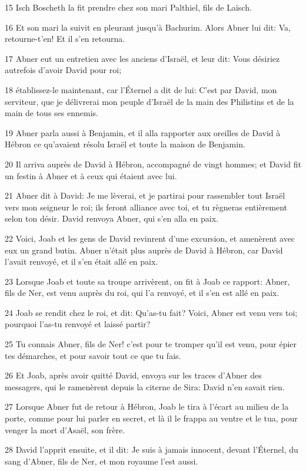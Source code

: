 \par 15 Isch Boscheth la fit prendre chez son mari Palthiel, fils de Laïsch.
\par 16 Et son mari la suivit en pleurant jusqu'à Bachurim. Alors Abner lui dit: Va, retourne-t'en! Et il s'en retourna.
\par 17 Abner eut un entretien avec les anciens d'Israël, et leur dit: Vous désiriez autrefois d'avoir David pour roi;
\par 18 établissez-le maintenant, car l'Éternel a dit de lui: C'est par David, mon serviteur, que je délivrerai mon peuple d'Israël de la main des Philistins et de la main de tous ses ennemis.
\par 19 Abner parla aussi à Benjamin, et il alla rapporter aux oreilles de David à Hébron ce qu'avaient résolu Israël et toute la maison de Benjamin.
\par 20 Il arriva auprès de David à Hébron, accompagné de vingt hommes; et David fit un festin à Abner et à ceux qui étaient avec lui.
\par 21 Abner dit à David: Je me lèverai, et je partirai pour rassembler tout Israël vers mon seigneur le roi; ils feront alliance avec toi, et tu règneras entièrement selon ton désir. David renvoya Abner, qui s'en alla en paix.
\par 22 Voici, Joab et les gens de David revinrent d'une excursion, et amenèrent avec eux un grand butin. Abner n'était plus auprès de David à Hébron, car David l'avait renvoyé, et il s'en était allé en paix.
\par 23 Lorsque Joab et toute sa troupe arrivèrent, on fit à Joab ce rapport: Abner, fils de Ner, est venu auprès du roi, qui l'a renvoyé, et il s'en est allé en paix.
\par 24 Joab se rendit chez le roi, et dit: Qu'as-tu fait? Voici, Abner est venu vers toi; pourquoi l'as-tu renvoyé et laissé partir?
\par 25 Tu connais Abner, fils de Ner! c'est pour te tromper qu'il est venu, pour épier tes démarches, et pour savoir tout ce que tu fais.
\par 26 Et Joab, après avoir quitté David, envoya sur les traces d'Abner des messagers, qui le ramenèrent depuis la citerne de Sira: David n'en savait rien.
\par 27 Lorsque Abner fut de retour à Hébron, Joab le tira à l'écart au milieu de la porte, comme pour lui parler en secret, et là il le frappa au ventre et le tua, pour venger la mort d'Asaël, son frère.
\par 28 David l'apprit ensuite, et il dit: Je suis à jamais innocent, devant l'Éternel, du sang d'Abner, fils de Ner, et mon royaume l'est aussi.
